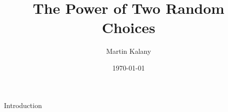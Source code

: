 \documentclass[serif,professionalfonts]{beamer}
\title{The Power of Two Random Choices}
\author[M. Kalany]{Martin Kalany}
\institute[TU Wien]
{
  Graduate student in Computer Science\\
  Vienna University of Technology\\
}
\date{\today}
\begin{document}
\begin{frame}
  \titlepage
\end{frame}
\note{}

\begin{comment}
\begin{frame}[label=references]
  \frametitle{References}
  
  
\end{frame}
\note{}
\end{comment}



\begin{frame}{Introduction}
\end{frame}
\note{}

\end{document}
